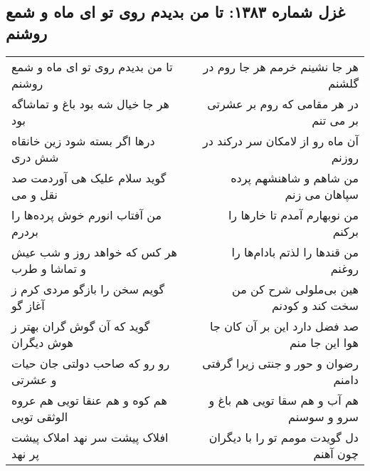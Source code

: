 \begin{center}
\section*{غزل شماره ۱۳۸۳: تا من بدیدم روی تو ای ماه و شمع روشنم}
\label{sec:1383}
\begin{longtable}{l p{0.5cm} r}
تا من بدیدم روی تو ای ماه و شمع روشنم
&&
هر جا نشینم خرمم هر جا روم در گلشنم
\\
هر جا خیال شه بود باغ و تماشاگه بود
&&
در هر مقامی که روم بر عشرتی بر می تنم
\\
درها اگر بسته شود زین خانقاه شش دری
&&
آن ماه رو از لامکان سر درکند در روزنم
\\
گوید سلام علیک هی آوردمت صد نقل و می
&&
من شاهم و شاهنشهم پرده سپاهان می زنم
\\
من آفتاب انورم خوش پرده‌ها را بردرم
&&
من نوبهارم آمدم تا خارها را برکنم
\\
هر کس که خواهد روز و شب عیش و تماشا و طرب
&&
من قندها را لذتم بادام‌ها را روغنم
\\
گویم سخن را بازگو مردی کرم ز آغاز گو
&&
هین بی‌ملولی شرح کن من سخت کند و کودنم
\\
گوید که آن گوش گران بهتر ز هوش دیگران
&&
صد فضل دارد این بر آن کان جا هوا این جا منم
\\
رو رو که صاحب دولتی جان حیات و عشرتی
&&
رضوان و حور و جنتی زیرا گرفتی دامنم
\\
هم کوه و هم عنقا تویی هم عروه الوثقی تویی
&&
هم آب و هم سقا تویی هم باغ و سرو و سوسنم
\\
افلاک پیشت سر نهد املاک پیشت پر نهد
&&
دل گویدت مومم تو را با دیگران چون آهنم
\\
\end{longtable}
\end{center}
